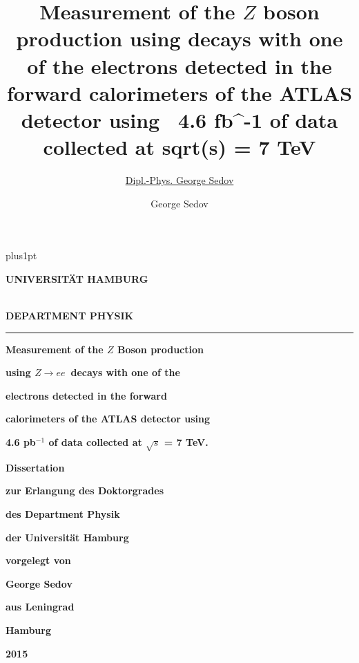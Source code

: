\documentclass[oneside,11pt]{Classes/PhDthesisPSnPDF}
\title{Measurement of the $Z$ boson production using \Zee decays with one of the electrons
detected in the forward calorimeters of the ATLAS detector using  4.6 {fb}^{-1} of data
collected at sqrt(s) = 7 TeV}
\author{\href{radist.morse@gmail.com}{Dipl.-Phys. George Sedov}}
\author{George Sedov}
\def\Zee{\ensuremath{Z \rightarrow ee}}
\begin{document}
\linenumbers
\hypersetup{linktocpage}
%

\renewcommand\baselinestretch{1.2}
\baselineskip=16pt plus1pt


\begin{titlepage}
\vspace*{-1.6cm}
{\raggedright \large \bf \MakeUppercase{Universit\"{a}t Hamburg}} \\
{\large \bf \MakeUppercase{Department Physik} }\\
  \rule{\textwidth}{0.5pt}
    \vspace*{1.0cm}
	\begin{center}

	     {\huge\bf{Measurement of the $Z$ Boson production}\par}
           \vspace*{0.2cm}
	     {\huge\bf{using \Zee\ decays with one of the}\par}
           \vspace*{0.2cm}
	     {\huge\bf{electrons detected in the forward}\par}
           \vspace*{0.2cm}
	     {\huge\bf{calorimeters of the ATLAS detector using }\par}
           \vspace*{0.2cm}
	     {\huge\bf{4.6 pb$^{-1}$ of data collected at $\sqrt{s}$ = 7 TeV.}\par}

	        \vspace*{2.6cm}
        {\LARGE\bf Dissertation\par}
	        \vspace*{0.1cm}
	     {\LARGE\bf zur Erlangung des Doktorgrades\par }
	        \vspace*{0.1cm}
        {\LARGE\bf des Department Physik\par }
           \vspace*{0.1cm}
	     {\LARGE\bf der Universit\"{a}t Hamburg \par }
	        \vspace*{2.2cm}
        {\Large\bf vorgelegt von\par}
	        \vspace*{0.1cm}
        {\Large\bf George Sedov\par }
           \vspace{0.1cm}
	     {\Large\bf aus Leningrad \par }
	        \vspace*{2.2cm}
        {\Large\bf{Hamburg}\par}
	        \vspace*{0.1cm}
        {\Large\bf{2015}}
\end{center}
\end{titlepage}
\end{document}
